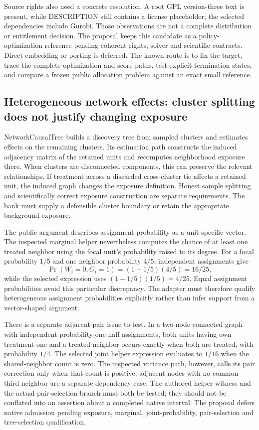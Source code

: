 Source rights also need a concrete resolution. A root GPL version-three text is present, while DESCRIPTION still contains a license placeholder; the selected dependencies include Gurobi. Those observations are not a complete distribution or entitlement decision. The proposal keeps this candidate as a policy-optimization reference pending coherent rights, solver and scientific contracts. Direct embedding or porting is deferred. The known route is to fix the target, trace the complete optimization and score paths, test explicit termination states, and compare a frozen public allocation problem against an exact small reference.\citep{exec25_rnet_target,exec25_rnet_choice}

\subsection{Heterogeneous network effects: cluster splitting does not justify changing exposure}

NetworkCausalTree builds a discovery tree from sampled clusters and estimates effects on the remaining clusters. Its estimation path constructs the induced adjacency matrix of the retained units and recomputes neighborhood exposure there. When clusters are disconnected components, this can preserve the relevant relationships. If treatment across a discarded cross-cluster tie affects a retained unit, the induced graph changes the exposure definition. Honest sample splitting and scientifically correct exposure construction are separate requirements. The bank must supply a defensible cluster boundary or retain the appropriate background exposure.\citep{exec25_rnet_tree}

The public argument describes assignment probability as a unit-specific vector. The inspected marginal helper nevertheless computes the chance of at least one treated neighbor using the focal unit's probability raised to its degree. For a focal probability $1/5$ and one neighbor probability $4/5$, independent assignments give
\[
 \Pr(W_i=0,G_i=1)=(1-1/5)(4/5)=16/25,
\]
while the selected expression uses $(1-1/5)(1/5)=4/25$. Equal assignment probabilities avoid this particular discrepancy. The adapter must therefore qualify heterogeneous assignment probabilities explicitly rather than infer support from a vector-shaped argument.\citep{exec25_rnet_tree,exec25_rnet_choice}

There is a separate adjacent-pair issue to test. In a two-node connected graph with independent probability-one-half assignments, both units having own treatment one and a treated neighbor occurs exactly when both are treated, with probability $1/4$. The selected joint helper expression evaluates to $1/16$ when the shared-neighbor count is zero. The inspected variance path, however, calls its pair correction only when that count is positive: adjacent nodes with no common third neighbor are a separate dependency case. The authored helper witness and the actual pair-selection branch must both be tested; they should not be conflated into an assertion about a completed native interval. The proposal defers native admission pending exposure, marginal, joint-probability, pair-selection and tree-selection qualification.\citep{exec25_rnet_tree,exec25_rnet_choice}

